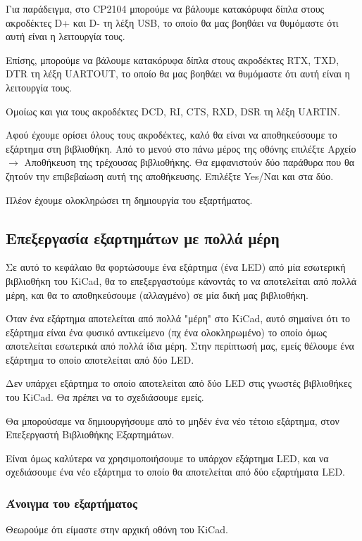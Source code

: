 \documentclass[a4paper]{article}
\begin{document}
Για παράδειγμα, στο \textenglish{CP2104} μπορούμε να βάλουμε κατακόρυφα δίπλα στους ακροδέκτες D+ και D- τη λέξη USB, το οποίο θα μας βοηθάει να θυμόμαστε ότι αυτή είναι η λειτουργία τους.

Επίσης, μπορούμε να βάλουμε κατακόρυφα δίπλα στους ακροδέκτες RTX, TXD, DTR τη λέξη UARTOUT, το οποίο θα μας βοηθάει να θυμόμαστε ότι αυτή είναι η λειτουργία τους.

Ομοίως και για τους ακροδέκτες DCD, RI, CTS, RXD, DSR τη λέξη UARTΙΝ.

Αφού έχουμε ορίσει όλους τους ακροδέκτες, καλό θα είναι να αποθηκεύσουμε το εξάρτημα στη βιβλιοθήκη. Από το μενού στο πάνω μέρος της οθόνης επιλέξτε Αρχείο $\rightarrow$ Αποθήκευση της τρέχουσας βιβλιοθήκης. Θα εμφανιστούν δύο παράθυρα που θα ζητούν την επιβεβαίωση αυτή της αποθήκευσης. Επιλέξτε Yes/Ναι και στα δύο.

Πλέον έχουμε ολοκληρώσει τη δημιουργία του εξαρτήματος.


\subsection{Επεξεργασία εξαρτημάτων με πολλά μέρη}

Σε αυτό το κεφάλαιο θα φορτώσουμε ένα εξάρτημα (ένα \textenglish{LED}) από μία εσωτερική βιβλιοθήκη του \textenglish{KiCad}, θα το επεξεργαστούμε κάνοντάς το να αποτελείται από πολλά μέρη, και θα το αποθηκεύσουμε (αλλαγμένο) σε μία δική μας βιβλιοθήκη.

Όταν ένα εξάρτημα αποτελείται από πολλά "μέρη" στο \textenglish{KiCad}, αυτό σημαίνει ότι το εξάρτημα είναι ένα φυσικό αντικείμενο (πχ ένα ολοκληρωμένο) το οποίο όμως αποτελείται εσωτερικά από πολλά ίδια μέρη. Στην περίπτωσή μας, εμείς θέλουμε ένα εξάρτημα το οποίο αποτελείται από δύο \textenglish{LED}.

Δεν υπάρχει εξάρτημα το οποίο αποτελείται από δύο \textenglish{LED} στις γνωστές βιβλιοθήκες του \textenglish{KiCad}. Θα πρέπει να το σχεδιάσουμε εμείς.

Θα μπορούσαμε να δημιουργήσουμε από το μηδέν ένα νέο τέτοιο εξάρτημα, στον Επεξεργαστή Βιβλιοθήκης Εξαρτημάτων. 

Είναι όμως καλύτερα να χρησιμοποιήσουμε το υπάρχον εξάρτημα \textenglish{LED}, και να σχεδιάσουμε ένα νέο εξάρτημα το οποίο θα αποτελείται από δύο εξαρτήματα \textenglish{LED}.

\subsubsection{Άνοιγμα του εξαρτήματος}
Θεωρούμε ότι είμαστε στην αρχική οθόνη του \textenglish{KiCad}. 
\end{document}
